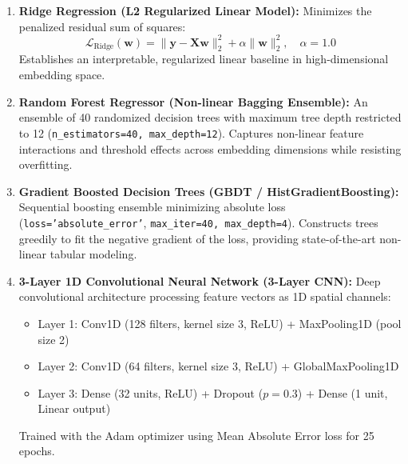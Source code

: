 \documentclass[11pt,a4paper]{article}
\begin{document}
\begin{enumerate}
    \item \textbf{Ridge Regression (L2 Regularized Linear Model):}
    Minimizes the penalized residual sum of squares:
    \begin{equation}
    \mathcal{L}_{\text{Ridge}}(\mathbf{w}) = \|\mathbf{y} - \mathbf{X}\mathbf{w}\|_2^2 + \alpha \|\mathbf{w}\|_2^2, \quad \alpha = 1.0
    \end{equation}
    Establishes an interpretable, regularized linear baseline in high-dimensional embedding space.
    
    \item \textbf{Random Forest Regressor (Non-linear Bagging Ensemble):}
    An ensemble of 40 randomized decision trees \cite{breiman2001random} with maximum tree depth restricted to 12 (\texttt{n\_estimators=40, max\_depth=12}). Captures non-linear feature interactions and threshold effects across embedding dimensions while resisting overfitting.
    
    \item \textbf{Gradient Boosted Decision Trees (GBDT / HistGradientBoosting):}
    Sequential boosting ensemble \cite{friedman2001greedy} minimizing absolute loss (\texttt{loss='absolute\_error'}, \texttt{max\_iter=40, max\_depth=4}). Constructs trees greedily to fit the negative gradient of the loss, providing state-of-the-art non-linear tabular modeling.
    
    \item \textbf{3-Layer 1D Convolutional Neural Network (3-Layer CNN):}
    Deep convolutional architecture processing feature vectors as 1D spatial channels:
    \begin{itemize}
        \item Layer 1: Conv1D (128 filters, kernel size 3, ReLU) + MaxPooling1D (pool size 2)
        \item Layer 2: Conv1D (64 filters, kernel size 3, ReLU) + GlobalMaxPooling1D
        \item Layer 3: Dense (32 units, ReLU) + Dropout ($p=0.3$) + Dense (1 unit, Linear output)
    \end{itemize}
    Trained with the Adam optimizer using Mean Absolute Error loss for 25 epochs.
\end{enumerate}

\end{document}
